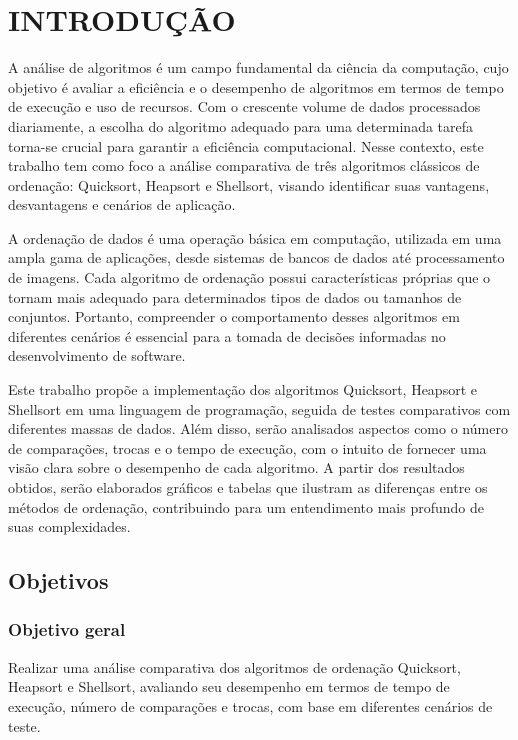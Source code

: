 \chapter{INTRODUÇÃO}
\label{chap:introducao }

A análise de algoritmos é um campo fundamental da ciência da computação, cujo objetivo é avaliar a eficiência e o desempenho de algoritmos em termos de tempo de execução e uso de recursos. Com o crescente volume de dados processados diariamente, a escolha do algoritmo adequado para uma determinada tarefa torna-se crucial para garantir a eficiência computacional. Nesse contexto, este trabalho tem como foco a análise comparativa de três algoritmos clássicos de ordenação: Quicksort, Heapsort e Shellsort, visando identificar suas vantagens, desvantagens e cenários de aplicação.

A ordenação de dados é uma operação básica em computação, utilizada em uma ampla gama de aplicações, desde sistemas de bancos de dados até processamento de imagens. Cada algoritmo de ordenação possui características próprias que o tornam mais adequado para determinados tipos de dados ou tamanhos de conjuntos. Portanto, compreender o comportamento desses algoritmos em diferentes cenários é essencial para a tomada de decisões informadas no desenvolvimento de software.

Este trabalho propõe a implementação dos algoritmos Quicksort, Heapsort e Shellsort em uma linguagem de programação, seguida de testes comparativos com diferentes massas de dados. Além disso, serão analisados aspectos como o número de comparações, trocas e o tempo de execução, com o intuito de fornecer uma visão clara sobre o desempenho de cada algoritmo. A partir dos resultados obtidos, serão elaborados gráficos e tabelas que ilustram as diferenças entre os métodos de ordenação, contribuindo para um entendimento mais profundo de suas complexidades.

\section{Objetivos}
\label{sec:objetivos }

\subsection{Objetivo geral}
\label{subsec:objetivogeral }

Realizar uma análise comparativa dos algoritmos de ordenação Quicksort, Heapsort e Shellsort, avaliando seu desempenho em termos de tempo de execução, número de comparações e trocas, com base em diferentes cenários de teste.

